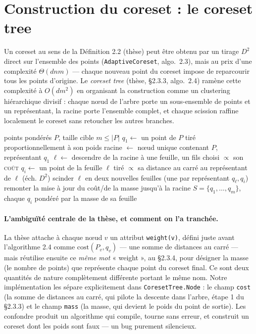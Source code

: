\section{Construction du coreset : le coreset tree}
\label{sec:algo-coreset-tree}

Un coreset au sens de la Définition 2.2 (thèse) peut être obtenu par un tirage
$D^2$ direct sur l'ensemble des points (\texttt{AdaptiveCoreset}, algo.~2.3),
mais au prix d'une complexité $\Theta(dnm)$ --- chaque nouveau point du coreset
impose de reparcourir tous les points d'origine. Le \emph{coreset tree}
(thèse, §2.3.3, algo.~2.4) ramène cette complexité à $O(dm^2)$ en organisant
la construction comme un clustering hiérarchique divisif : chaque n\oe{}ud de
l'arbre porte un sous-ensemble de points et un représentant, la racine porte
l'ensemble complet, et chaque scission raffine localement le coreset sans
retoucher les autres branches.

\begin{algorithm}[H]
\caption{Coreset tree (thèse, algo. 2.4 --- \texttt{CoresetTree.build})}
\begin{algorithmic}[1]
\Require points pondérés $P$, taille cible $m \le |P|$
\State $q_1 \gets$ un point de $P$ tiré proportionnellement à son poids 
\State racine $\gets$ n\oe{}ud unique contenant $P$, représentant $q_1$
  \State $\ell \gets$ descendre de la racine à une feuille, un fils choisi $\propto$ son \textsc{coût} 
  \State $q_i \gets$ un point de la feuille $\ell$ tiré $\propto$ sa distance au carré au représentant de $\ell$ (éch. $D^2$)
  \State scinder $\ell$ en deux nouvelles feuilles (une par représentant $q_\ell, q_i$)
  \State remonter la mise à jour du coût/de la masse jusqu'à la racine
\EndFor
\Ensure $S = \{q_1,\dots,q_m\}$, chaque $q_i$ pondéré par la masse de sa feuille
\end{algorithmic}
\end{algorithm}

\paragraph{L'ambiguïté centrale de la thèse, et comment on l'a tranchée.}
\label{par:cost-vs-mass}
La thèse attache à chaque n\oe{}ud $v$ un attribut \texttt{weight(v)}, défini
juste avant l'algorithme 2.4 comme $\mathrm{cost}(P_v, q_v)$ --- une somme de
distances au carré --- mais réutilise ensuite ce \emph{même mot} « weight »,
au §2.3.4, pour désigner la masse (le nombre de points) que représente
chaque point du coreset final. Ce sont deux quantités de nature complètement
différente portant le même nom. Notre implémentation les sépare
explicitement dans \texttt{CoresetTree.Node} : le champ \texttt{cost}
(la somme de distances au carré, qui pilote la descente dans l'arbre, étape 1
du §2.3.3) et le champ \texttt{mass} (la masse, qui devient le poids du point
de sortie). Les confondre produit un algorithme qui compile, tourne sans
erreur, et construit un coreset dont les poids sont faux --- un bug purement
silencieux.

